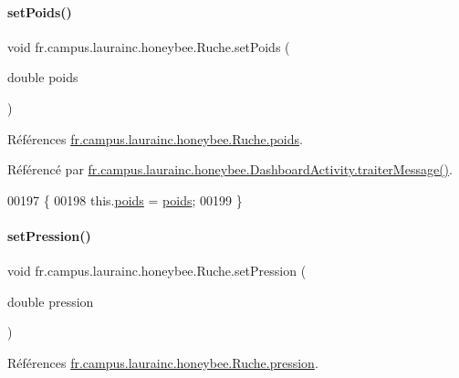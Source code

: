 \paragraph{\texorpdfstring{set\+Poids()}{setPoids()}}
{\footnotesize\ttfamily void fr.\+campus.\+laurainc.\+honeybee.\+Ruche.\+set\+Poids (\begin{DoxyParamCaption}\item[{double}]{poids }\end{DoxyParamCaption})}



Références \hyperlink{classfr_1_1campus_1_1laurainc_1_1honeybee_1_1_ruche_a9e4ace1f74bc297cb50e99643203367b}{fr.\+campus.\+laurainc.\+honeybee.\+Ruche.\+poids}.



Référencé par \hyperlink{classfr_1_1campus_1_1laurainc_1_1honeybee_1_1_dashboard_activity_a50d4c14e993ff1779ae5dce8cee11216}{fr.\+campus.\+laurainc.\+honeybee.\+Dashboard\+Activity.\+traiter\+Message()}.


\begin{DoxyCode}
00197                                        \{
00198         this.\hyperlink{classfr_1_1campus_1_1laurainc_1_1honeybee_1_1_ruche_a9e4ace1f74bc297cb50e99643203367b}{poids} = \hyperlink{classfr_1_1campus_1_1laurainc_1_1honeybee_1_1_ruche_a9e4ace1f74bc297cb50e99643203367b}{poids};
00199     \}
\end{DoxyCode}
\mbox{\label{classfr_1_1campus_1_1laurainc_1_1honeybee_1_1_ruche_a149083353b1430ef67fef5de226f8947}} 
\paragraph{\texorpdfstring{set\+Pression()}{setPression()}}
{\footnotesize\ttfamily void fr.\+campus.\+laurainc.\+honeybee.\+Ruche.\+set\+Pression (\begin{DoxyParamCaption}\item[{double}]{pression }\end{DoxyParamCaption})}



Références \hyperlink{classfr_1_1campus_1_1laurainc_1_1honeybee_1_1_ruche_a73ddf7686cdd056fe7dc4b249f6ada86}{fr.\+campus.\+laurainc.\+honeybee.\+Ruche.\+pression}.



